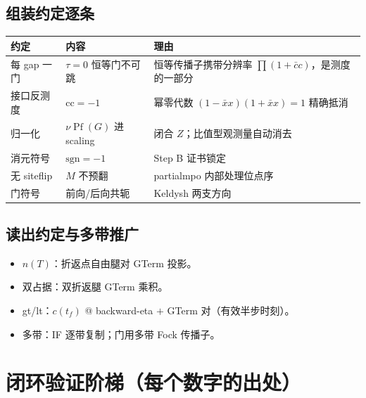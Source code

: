 \documentclass[11pt,a4paper]{ctexart}
\newcommand{\Pf}{\operatorname{Pf}}
\theoremstyle{plain}
\theoremstyle{definition}
\theoremstyle{remark}
\begin{document}
\subsection{组装约定逐条}\label{sec:conv}

\begin{table}[htbp]
\centering
\begin{tabular}{lll}
\toprule
约定 & 内容 & 理由 \\
\midrule
每 gap 一门 & $\tau = 0$ 恒等门不可跳 & 恒等传播子携带分辨率 $\prod(1 + \bar c c)$，是测度的一部分 \\
接口反测度 & $\mathrm{cc} = -1$ & 幂零代数 $(1 - \bar x x)(1 + \bar x x) = 1$ 精确抵消 \\
归一化 & $\nu\Pf(G)$ 进 scaling & 闭合 $Z$；比值型观测量自动消去 \\
消元符号 & $\mathrm{sgn} = -1$ & Step B 证书锁定 \\
无 siteflip & $M$ 不预翻 & partialmpo 内部处理位点序 \\
门符号 & 前向/后向共轭 & Keldysh 两支方向 \\
\bottomrule
\end{tabular}
\end{table}

\subsection{读出约定与多带推广}\label{sec:multiband}

\begin{itemize}
\item $n(T)$：折返点自由腿对 GTerm 投影。
\item 双占据：双折返腿 GTerm 乘积。
\item gt/lt：$c(t_f)$ @ backward-eta $+$ GTerm 对（有效半步时刻）。
\item 多带：IF 逐带复制；门用多带 Fock 传播子。
\end{itemize}

\section{闭环验证阶梯（每个数字的出处）}\label{sec:ladder}
\end{document}
